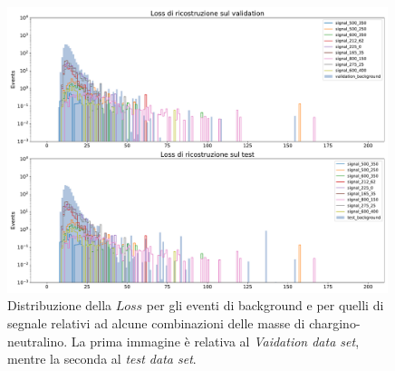 \begin{figure}[h!]
	\centering
	\includegraphics[width=0.99\textwidth]{figs/risultati_simulazione/distribuzioneLoss.pdf}
	\caption{Distribuzione della $\textit{Loss}$ per gli eventi di background e per quelli di segnale relativi ad alcune combinazioni delle masse di chargino-neutralino. La prima immagine è relativa al \textit{Vaidation data set}, mentre la seconda al \textit{test data set}.}
	\label{distribuzione_loss}
\end{figure}

